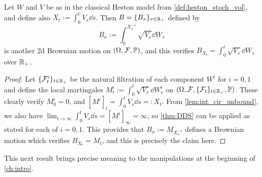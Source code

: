 \begin{lemma}\label{lem:heston_timechange}
    Let $W$ and $V$ be as in the classical Heston model from  \autoref{def:heston_stoch_vol}, and define also $X_t:=\int_0^t V_s\dd s$. Then $B=\{B_x\}_{x\in\mathbb{R}_+}$ defined by
    \begin{equation}
        B_x := \int_0^{X^{-1}_x}\sqrt{V_s}\dd W_s
    \end{equation}
    is another 2d Brownian motion on $(\Omega, \mathcal{F},\mathbb{P})$, and this verifies $B_{X_t} = \int_0^t\sqrt{V_s}\dd W_s$ over $\mathbb{R}_+$.
\end{lemma}
\begin{proof}
    Let $\{\mathcal{F}^i_t\}_{t\in\mathbb{R}_+}$ be the natural filtration of each component $W^i$ for $i=0,1$ and define the local martingales $M^i_t:=\int_0^t \sqrt{V_s}\dd W^i_s$ on $(\Omega,\mathcal{F},\{\mathcal{F}_t\}_{t\in\mathbb{R}_+},\mathbb{P})$. These clearly verify $M^i_0=0$, and $[M^i]_t=\int_0^t V_s\dd s =: X_t$. From \autoref{lem:int_cir_unbound}, we also have $\lim_{t\to\infty}\int_0^tV_s\dd s=[M^i]_\infty=\infty$, so \autoref{thm:DDS} can be applied as stated for each of $i=0,1$. This provides that $B_x:=M_{X^{-1}_x}$ defines a Brownian motion which verifies $B_{X_t}=M_t$, and this is precisely the claim here.
\end{proof}

This next result brings precise meaning to the manipulations at the beginning of \autoref{ch:intro}.

